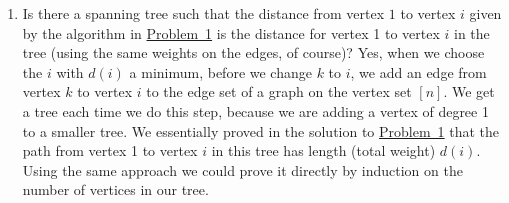 \documentclass[10pt,]{book}
\theoremstyle{plain}
\theoremstyle{definition}
\numberwithin{equation}{chapter}
\begin{document}
\begin{enumerate}
\item\hypertarget{li-35}{}Is there a spanning tree such that the distance from vertex \(1\) to vertex \(i\) given by the algorithm in \hyperlink{Dijkstra}{Problem~1} is the distance for vertex 1 to vertex \(i\) in the tree (using the same weights on the edges, of course)? Yes, when we choose the \(i\) with \(d(i)\) a minimum, before we change \(k\) to \(i\), we add an edge from vertex \(k\) to vertex \(i\) to the edge set of a graph on the vertex set \([n]\). We get a tree each time we do this step, because we are adding a vertex of degree 1 to a smaller tree. We essentially proved in the solution to \hyperlink{Dijkstra}{Problem~1} that the path from vertex 1 to vertex \(i\) in this tree has length (total weight) \(d(i)\). Using the same approach we could prove it directly by induction on the number of vertices in our tree.%
 \setcounter{problemnumber}{\value{enumi}}%
\end{enumerate}
\vfilneg%
\typeout{************************************************}
\typeout{************************************************}
\end{document}
